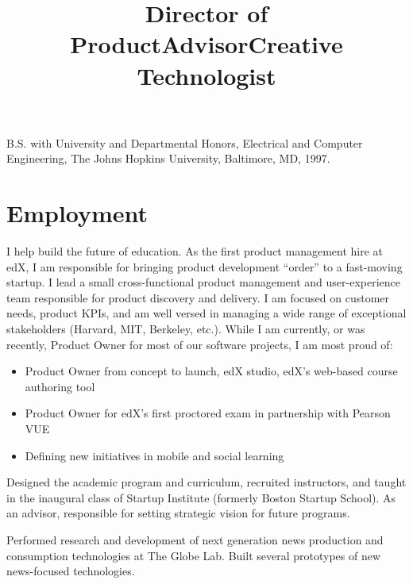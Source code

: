 \documentclass[line]{res}
\begin{document}
\begin{resume}
	B.S. with University and Departmental Honors, Electrical and Computer Engineering, The Johns Hopkins University, Baltimore, MD, 1997.
	
	\section{\sc Employment}

	\title{Director of Product} 
	 
	\begin{position}
		I help build the future of education. As the first product management hire
		at edX, I am responsible for bringing product development ``order'' to a
		fast-moving startup. I lead a small cross-functional product management and
		user-experience team responsible for product discovery and delivery. I am
		focused on customer needs, product KPIs, and am well versed in managing a
		wide range of exceptional stakeholders (Harvard, MIT, Berkeley, etc.). While
		I am currently, or was recently, Product Owner for most of our software
		projects, I am most proud of:
		\begin{itemize}
			\item Product Owner from concept to launch, edX studio, edX's web-based course authoring tool
			\item Product Owner for edX's first proctored exam in partnership with Pearson VUE
			\item Defining new initiatives in mobile and social learning
		\end{itemize}
	\end{position}
	
	\title{Advisor} 
	 
	\begin{position}		
		Designed the academic program and curriculum, recruited instructors, and taught
		in the inaugural class of Startup Institute (formerly Boston Startup
		School). As an advisor, responsible for setting strategic vision for future
		programs.
	\end{position}
	
	\title{Creative Technologist} 
	  
	\begin{position}
		Performed research and development of next generation news production and consumption
    technologies at The Globe Lab. Built several prototypes of new news-focused technologies.
	\end{position}
	

\end{resume}
\end{document}
